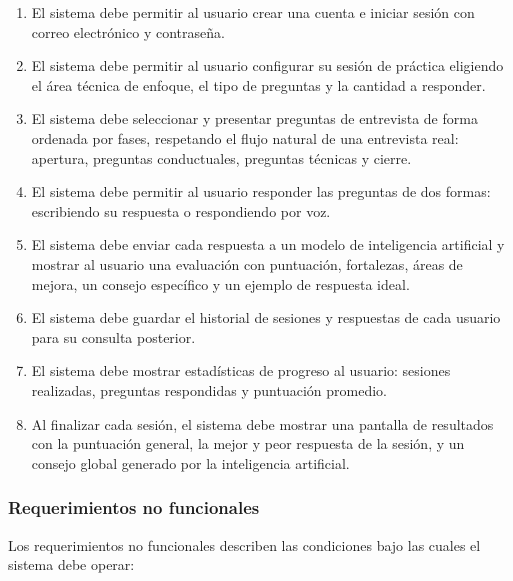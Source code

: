 \begin{enumerate}
    \item El sistema debe permitir al usuario crear una cuenta e
    iniciar sesión con correo electrónico y contraseña.

    \item El sistema debe permitir al usuario configurar su sesión
    de práctica eligiendo el área técnica de enfoque, el tipo de
    preguntas y la cantidad a responder.

    \item El sistema debe seleccionar y presentar preguntas de
    entrevista de forma ordenada por fases, respetando el flujo
    natural de una entrevista real: apertura, preguntas conductuales,
    preguntas técnicas y cierre.

    \item El sistema debe permitir al usuario responder las preguntas
    de dos formas: escribiendo su respuesta o respondiendo por voz.

    \item El sistema debe enviar cada respuesta a un modelo de
    inteligencia artificial y mostrar al usuario una evaluación
    con puntuación, fortalezas, áreas de mejora, un consejo
    específico y un ejemplo de respuesta ideal.

    \item El sistema debe guardar el historial de sesiones y
    respuestas de cada usuario para su consulta posterior.

    \item El sistema debe mostrar estadísticas de progreso al usuario:
    sesiones realizadas, preguntas respondidas y puntuación promedio.

    \item Al finalizar cada sesión, el sistema debe mostrar una
    pantalla de resultados con la puntuación general, la mejor y
    peor respuesta de la sesión, y un consejo global generado por
    la inteligencia artificial.
\end{enumerate}

\subsubsection{Requerimientos no funcionales}

Los requerimientos no funcionales describen las condiciones bajo las
cuales el sistema debe operar:

